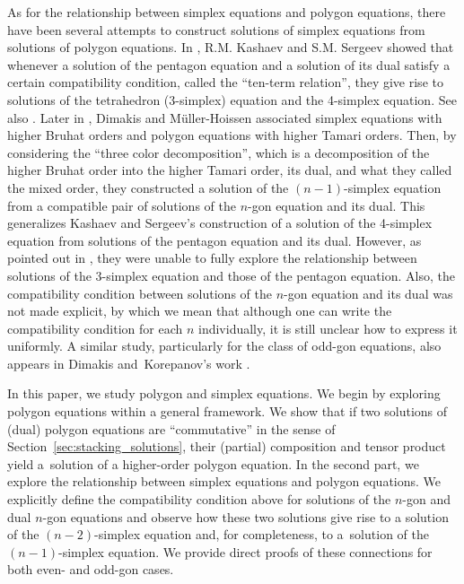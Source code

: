 \documentclass[10pt,a4paper]{amsart}
\numberwithin{equation}{section}
\theoremstyle{definition}
\begin{document}
As for the relationship between simplex equations and polygon equations, there have been several attempts to construct solutions of simplex equations from solutions of polygon equations. In \cite{kashaev1998pentagon}, R.M. Kashaev and S.M. Sergeev showed that whenever a solution of the pentagon equation and a solution of its dual satisfy a certain compatibility condition, called the ``ten-term relation'', they give rise to solutions of the tetrahedron (3-simplex) equation and the 4-simplex equation. See also \cite{kassotakis2023matrix}. Later in \cite{dimakis2015simplex}, Dimakis and M\"uller-Hoissen associated simplex equations with higher Bruhat orders and polygon equations with higher Tamari orders. Then, by considering the ``three color decomposition'', which is a decomposition of the higher Bruhat order into the higher Tamari order, its dual, and what they called the mixed order, they constructed a solution of the $(n-1)$-simplex equation from a compatible pair of solutions of the $n$-gon equation and its dual. This generalizes Kashaev and Sergeev's construction of a solution of the 4-simplex equation from solutions of the pentagon equation and its dual. However, as pointed out in \cite[Section~6]{dimakis2015simplex}, they were unable to fully explore the relationship between solutions of the 3-simplex equation and those of the pentagon equation. Also, the compatibility condition between solutions of the $n$-gon equation and its dual was not made explicit, by which we mean that although one can write the compatibility condition for each $n$ individually, it is still unclear how to express it uniformly. A similar study, particularly for the class of odd-gon equations, also appears in Dimakis and~Korepanov's work \cite{dimakis2021grassmannian}.


In this paper, we study polygon and simplex equations. We begin by exploring polygon equations within a general framework. We show that if two solutions of (dual) polygon equations are ``commutative'' in the sense of Section~\ref{sec:stacking_solutions}, their (partial) composition and tensor product yield a~solution of a higher-order polygon equation. In the second part, we explore the relationship between simplex equations and polygon equations. We explicitly define the compatibility condition above for solutions of the $n$-gon and dual $n$-gon equations and observe how these two solutions give rise to a solution of the $(n-2)$-simplex equation and, for completeness, to a~solution of the $(n-1)$-simplex equation. We provide direct proofs of these connections for both even- and odd-gon cases.
\end{document}
